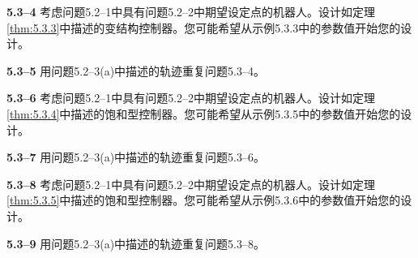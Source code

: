 \documentclass[UTF8,12pt,a4paper]{ctexart}
\begin{document}
\textbf{5.3--4} 考虑问题5.2--1中具有问题5.2--2中期望设定点的机器人。设计如定理\ref{thm:5.3.3}中描述的变结构控制器。您可能希望从示例5.3.3中的参数值开始您的设计。

\textbf{5.3--5} 用问题5.2--3(a)中描述的轨迹重复问题5.3--4。

\textbf{5.3--6} 考虑问题5.2--1中具有问题5.2--2中期望设定点的机器人。设计如定理\ref{thm:5.3.4}中描述的饱和型控制器。您可能希望从示例5.3.5中的参数值开始您的设计。

\textbf{5.3--7} 用问题5.2--3(a)中描述的轨迹重复问题5.3--6。

\textbf{5.3--8} 考虑问题5.2--1中具有问题5.2--2中期望设定点的机器人。设计如定理\ref{thm:5.3.5}中描述的饱和型控制器。您可能希望从示例5.3.6中的参数值开始您的设计。

\textbf{5.3--9} 用问题5.2--3(a)中描述的轨迹重复问题5.3--8。

\ifstandalone
  
\end{document}

